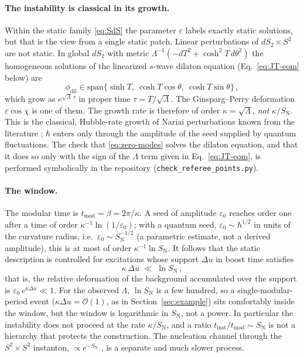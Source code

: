 \documentclass[11pt]{article}
\begin{document}
\paragraph{The instability is classical in its growth.} Within the static family \eqref{eq:SdS} the parameter $\varepsilon$ labels exactly static solutions, but that is the view from a single static patch. Linear perturbations of $dS_2\times S^2$ are not static. In global $dS_2$ with metric $\Lambda^{-1}(-dT^2+\cosh^2T\,d\theta^2)$ the homogeneous solutions of the linearized $s$-wave dilaton equation (Eq.~\eqref{eq:JT-eom} below) are
\begin{equation}
\phi_{\mathrm{dil}} \in \mathrm{span}\{\sinh T,\ \cosh T\cos\theta,\ \cosh T\sin\theta\}\,,
\label{eq:zero-modes}
\end{equation}
which grow as $e^{\sqrt{\Lambda}\,\tau}$ in proper time $\tau = T/\sqrt\Lambda$. The Ginsparg--Perry deformation $\varepsilon\cos\chi$ is one of them. The growth rate is therefore of order $\kappa=\sqrt\Lambda$, \emph{not} $\kappa/S_{\mathrm N}$. This is the classical, Hubble-rate growth of Nariai perturbations known from the literature \cite{Bousso1998}; $\hbar$ enters only through the amplitude of the seed supplied by quantum fluctuations. The check that \eqref{eq:zero-modes} solves the dilaton equation, and that it does so only with the sign of the $\Lambda$ term given in Eq.~\eqref{eq:JT-eom}, is performed symbolically in the repository (\texttt{check\_referee\_points.py}).

\paragraph{The window.} The modular time is $t_{\mathrm{mod}}=\beta=2\pi/\kappa$. A seed of amplitude $\varepsilon_0$ reaches order one after a time of order $\kappa^{-1}\ln(1/\varepsilon_0)$; with a quantum seed, $\varepsilon_0\sim \hbar^{1/2}$ in units of the curvature radius, i.e.\ $\varepsilon_0\sim S_{\mathrm N}^{-1/2}$ (a parametric estimate, not a derived amplitude), this is at most of order $\kappa^{-1}\ln S_{\mathrm N}$. It follows that the static description is controlled for excitations whose support $\Delta u$ in boost time satisfies
\begin{equation}
\kappa\,\Delta u \;\ll\; \ln S_{\mathrm N}\,,
\label{eq:hierarchy}
\end{equation}
that is, the relative deformation of the background accumulated over the support is $\varepsilon_0\,e^{\kappa\Delta u}\ll1$. For the observed $\Lambda$, $\ln S_{\mathrm N}$ is a few hundred, so a single-modular-period event ($\kappa\Delta u=\mathcal O(1)$, as in Section~\ref{sec:example}) sits comfortably inside the window, but the window is logarithmic in $S_{\mathrm N}$, not a power. In particular the instability does not proceed at the rate $\kappa/S_{\mathrm N}$, and a ratio $t_{\mathrm{inst}}/t_{\mathrm{mod}}\sim S_{\mathrm N}$ is not a hierarchy that protects the construction. The nucleation channel through the $S^2\times S^2$ instanton, $\propto e^{-S_{\mathrm N}}$ \cite{GinspargPerry}, is a separate and much slower process.
\end{document}
